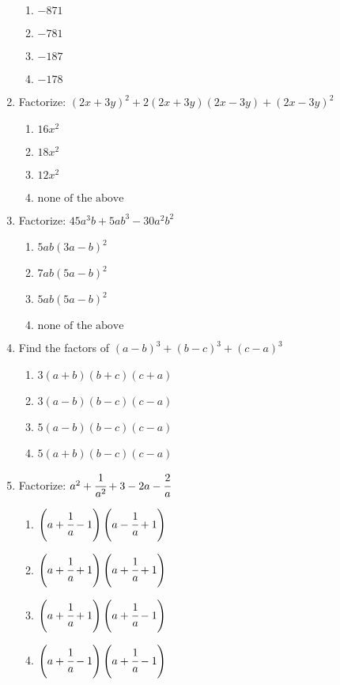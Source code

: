 \begin{multicols}{2}
\begin{enumerate}[label={\arabic*.}]
      \begin{enumerate}[label={\Alph*.}]
        \item \(-871\)
        \item \(-781\)
        \item \(-187\)
        \item \(-178\)
      \end{enumerate}
    \item Factorize: $(2x + 3y)^2 + 2(2x + 3y)(2x - 3y) + (2x - 3y)^2$
      \begin{enumerate}[label={\Alph*.}]
        \item \(16x^2\)
        \item \(18x^2\)
        \item \(12x^2\)
        \item \(\text{none of the above }\)
      \end{enumerate}
    \item Factorize: $45a^3b + 5ab^3 -30a^2b^2$
      \begin{enumerate}[label={\Alph*.}]
        \item \(5ab(3a -b)^2\)
        \item \(7ab(5a - b)^2\)
        \item \(5ab(5a - b)^2\)
        \item \(\text{none of the above}\)
      \end{enumerate}
    \item Find the factors of $(a-b)^3 + (b-c)^3 + (c-a)^3$
      \begin{enumerate}[label={\Alph*.}]
        \item \(3(a+b)(b+c)(c+a)\)
        \item \(3(a-b)(b-c)(c-a)\)
        \item \(5(a-b)(b-c)(c-a)\)
        \item \(5(a+b)(b-c)(c-a)\)
      \end{enumerate}
    \item Factorize: $a^2 + \cfrac{1}{a^2} + 3 - 2a - \cfrac{2}{a}$ 
      \begin{enumerate}[label={\Alph*.}]
        \item \(\left(a+ \cfrac{1}{a} - 1\right)\left(a - \cfrac{1}{a} + 1\right)\)
        \item \(\left(a + \cfrac{1}{a} + 1\right) \left(a+ \cfrac{1}{a} + 1\right) \)
        \item \(\left(a + \cfrac{1}{a} + 1\right) \left(a+ \cfrac{1}{a} - 1\right)\)
        \item \(\left(a + \cfrac{1}{a} - 1\right) \left(a+ \cfrac{1}{a} - 1\right)\)

\end{enumerate}
\end{enumerate}
\end{multicols}
